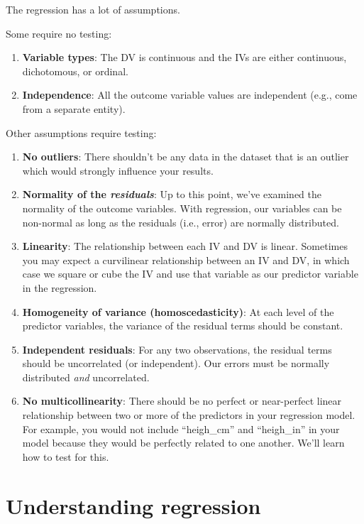 \documentclass[
]{book}
\begin{document}
The regression has a lot of assumptions.

Some require no testing:

\begin{enumerate}
\def\labelenumi{\arabic{enumi}.}
\item
  \textbf{Variable types}: The DV is continuous and the IVs are either continuous, dichotomous, or ordinal.
\item
  \textbf{Independence}: All the outcome variable values are independent (e.g., come from a separate entity).
\end{enumerate}

Other assumptions require testing:

\begin{enumerate}
\def\labelenumi{\arabic{enumi}.}
\item
  \textbf{No outliers}: There shouldn't be any data in the dataset that is an outlier which would strongly influence your results.
\item
  \textbf{Normality of the \emph{residuals}}: Up to this point, we've examined the normality of the outcome variables. With regression, our variables can be non-normal as long as the residuals (i.e., error) are normally distributed.
\item
  \textbf{Linearity}: The relationship between each IV and DV is linear. Sometimes you may expect a curvilinear relationship between an IV and DV, in which case we square or cube the IV and use that variable as our predictor variable in the regression.
\item
  \textbf{Homogeneity of variance (homoscedasticity)}: At each level of the predictor variables, the variance of the residual terms should be constant.
\item
  \textbf{Independent residuals}: For any two observations, the residual terms should be uncorrelated (or independent). Our errors must be normally distributed \emph{and} uncorrelated.
\item
  \textbf{No multicollinearity}: There should be no perfect or near-perfect linear relationship between two or more of the predictors in your regression model. For example, you would not include ``heigh\_cm'' and ``heigh\_in'' in your model because they would be perfectly related to one another. We'll learn how to test for this.
\end{enumerate}

\hypertarget{understanding-regression}{%
\section{Understanding regression}\label{understanding-regression}}
\end{document}
